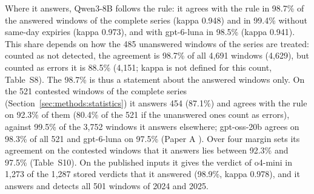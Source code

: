 Where it answers, Qwen3-8B follows the rule: it agrees with the rule in 98.7\% of the answered windows of the complete series (kappa 0.948) and in 99.4\% without same-day expiries (kappa 0.973), and with gpt-6-luna in 98.5\% (kappa 0.941). This share depends on how the 485 unanswered windows of the series are treated: counted as not detected, the agreement is 98.7\% of all 4{,}691 windows (4{,}629), but counted as errors it is 88.5\% (4{,}151; kappa is not defined for this count, Table~S8). The 98.7\% is thus a statement about the answered windows only. On the 521 contested windows of the complete series (Section~\ref{sec:methods:statistics}) it answers 454 (87.1\%) and agrees with the rule on 92.3\% of them (80.4\% of the 521 if the unanswered ones count as errors), against 99.5\% of the 3{,}752 windows it answers elsewhere; gpt-oss-20b agrees on 98.3\% of all 521 and gpt-6-luna on 97.5\% (Paper A \cite{regan2026rerun}). Over four margin sets its agreement on the contested windows that it answers lies between 92.3\% and 97.5\% (Table~S10). On the published inputs it gives the verdict of o4-mini in 1{,}273 of the 1{,}287 stored verdicts that it answered (98.9\%, kappa 0.978), and it answers and detects all 501 windows of 2024 and 2025.

